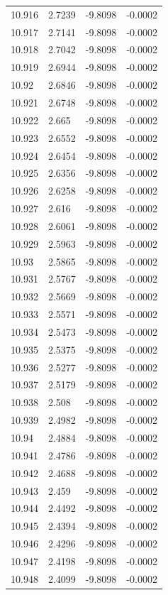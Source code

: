 \begin{tabular}{llll}
10.916 & 2.7239 & -9.8098 & -0.0002 \\
10.917 & 2.7141 & -9.8098 & -0.0002 \\
10.918 & 2.7042 & -9.8098 & -0.0002 \\
10.919 & 2.6944 & -9.8098 & -0.0002 \\
10.92 & 2.6846 & -9.8098 & -0.0002 \\
10.921 & 2.6748 & -9.8098 & -0.0002 \\
10.922 & 2.665 & -9.8098 & -0.0002 \\
10.923 & 2.6552 & -9.8098 & -0.0002 \\
10.924 & 2.6454 & -9.8098 & -0.0002 \\
10.925 & 2.6356 & -9.8098 & -0.0002 \\
10.926 & 2.6258 & -9.8098 & -0.0002 \\
10.927 & 2.616 & -9.8098 & -0.0002 \\
10.928 & 2.6061 & -9.8098 & -0.0002 \\
10.929 & 2.5963 & -9.8098 & -0.0002 \\
10.93 & 2.5865 & -9.8098 & -0.0002 \\
10.931 & 2.5767 & -9.8098 & -0.0002 \\
10.932 & 2.5669 & -9.8098 & -0.0002 \\
10.933 & 2.5571 & -9.8098 & -0.0002 \\
10.934 & 2.5473 & -9.8098 & -0.0002 \\
10.935 & 2.5375 & -9.8098 & -0.0002 \\
10.936 & 2.5277 & -9.8098 & -0.0002 \\
10.937 & 2.5179 & -9.8098 & -0.0002 \\
10.938 & 2.508 & -9.8098 & -0.0002 \\
10.939 & 2.4982 & -9.8098 & -0.0002 \\
10.94 & 2.4884 & -9.8098 & -0.0002 \\
10.941 & 2.4786 & -9.8098 & -0.0002 \\
10.942 & 2.4688 & -9.8098 & -0.0002 \\
10.943 & 2.459 & -9.8098 & -0.0002 \\
10.944 & 2.4492 & -9.8098 & -0.0002 \\
10.945 & 2.4394 & -9.8098 & -0.0002 \\
10.946 & 2.4296 & -9.8098 & -0.0002 \\
10.947 & 2.4198 & -9.8098 & -0.0002 \\
10.948 & 2.4099 & -9.8098 & -0.0002 \\

\end{tabular}

